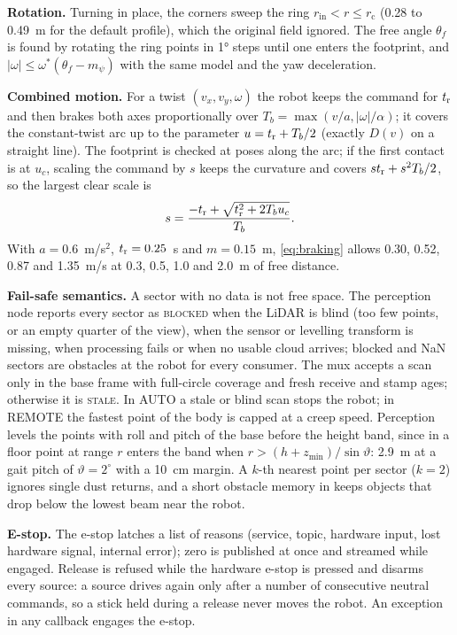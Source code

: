 \textbf{Rotation.} Turning in place, the corners sweep the ring $r_{\mathrm{in}} < r \le
r_{\mathrm{c}}$ (0.28 to 0.49~m for the default profile), which the original field ignored. The
free angle $\theta_f$ is found by rotating the ring points in 1° steps until one enters the
footprint, and $|\omega| \le \omega^*(\theta_f - m_\psi)$ with the same model and the yaw
deceleration.

\textbf{Combined motion.} For a twist $(v_x, v_y, \omega)$ the robot keeps the command for
$t_{\mathrm{r}}$ and then brakes both axes proportionally over $T_b = \max(v/a, |\omega|/\alpha)$; it
covers the constant-twist arc up to the parameter $u = t_{\mathrm{r}} + T_b/2$ (exactly $D(v)$ on a
straight line). The footprint is checked at poses along the arc; if the first contact is at
$u_c$, scaling the command by $s$ keeps the curvature and covers $st_{\mathrm{r}} + s^2 T_b/2$, so the
largest clear scale is
\begin{equation}
  s = \frac{-t_{\mathrm{r}} + \sqrt{t_{\mathrm{r}}^2 + 2 T_b u_c}}{T_b}.
\end{equation}
With $a = 0.6$~m/s$^2$, $t_{\mathrm{r}} = 0.25$~s and $m = 0.15$~m, \eqref{eq:braking} allows 0.30, 0.52,
0.87 and 1.35~m/s at 0.3, 0.5, 1.0 and 2.0~m of free distance.

\textbf{Fail-safe semantics.} A sector with no data is not free space. The perception node
reports every sector as \textsc{blocked} when the LiDAR is blind (too few points, or an empty
quarter of the view), when the sensor or levelling transform is missing, when processing fails
or when no usable cloud arrives; blocked and NaN sectors are obstacles at the robot for every
consumer. The mux accepts a scan only in the base frame with full-circle coverage and fresh
receive and stamp ages; otherwise it is \textsc{stale}. In AUTO a stale or blind scan stops the
robot; in REMOTE the fastest point of the body is capped at a creep speed. Perception levels
the points with roll and pitch of the base before the height band, since in  a
floor point at range $r$ enters the band when $r > (h + z_{\min})/\sin\vartheta$: 2.9~m at a
gait pitch of $\vartheta = 2^\circ$ with a 10~cm margin. A $k$-th nearest point per sector
($k = 2$) ignores single dust returns, and a short obstacle memory in  keeps objects
that drop below the lowest beam near the robot.

\textbf{E-stop.} The e-stop latches a list of reasons (service, topic, hardware input, lost
hardware signal, internal error); zero is published at once and streamed while engaged. Release
is refused while the hardware e-stop is pressed and disarms every source: a source drives again
only after a number of consecutive neutral commands, so a stick held during a release never
moves the robot. An exception in any callback engages the e-stop.

